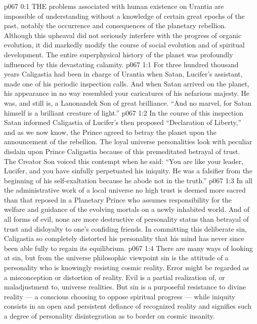 \vs p067 0:1 THE problems associated with human existence on Urantia are impossible of understanding without a knowledge of certain great epochs of the past, notably the occurrence and consequences of the planetary rebellion. Although this upheaval did not seriously interfere with the progress of organic evolution, it did markedly modify the course of social evolution and of spiritual development. The entire superphysical history of the planet was profoundly influenced by this devastating calamity.
\vs p067 1:1 For three hundred thousand years Caligastia had been in charge of Urantia when Satan, Lucifer’s assistant, made one of his periodic inspection calls. And when Satan arrived on the planet, his appearance in no way resembled your caricatures of his nefarious majesty. He was, and still is, a Lanonandek Son of great brilliance. “And no marvel, for Satan himself is a brilliant creature of light.”
\vs p067 1:2 In the course of this inspection Satan informed Caligastia of Lucifer’s then proposed “Declaration of Liberty,” and as we now know, the Prince agreed to betray the planet upon the announcement of the rebellion. The loyal universe personalities look with peculiar disdain upon Prince Caligastia because of this premeditated betrayal of trust. The Creator Son voiced this contempt when he said: “You are like your leader, Lucifer, and you have sinfully perpetuated his iniquity. He was a falsifier from the beginning of his self\hyp{}exaltation because he abode not in the truth.”
\vs p067 1:3 In all the administrative work of a local universe no high trust is deemed more sacred than that reposed in a Planetary Prince who assumes responsibility for the welfare and guidance of the evolving mortals on a newly inhabited world. And of all forms of evil, none are more destructive of personality status than betrayal of trust and disloyalty to one’s confiding friends. In committing this deliberate sin, Caligastia so completely distorted his personality that his mind has never since been able fully to regain its equilibrium.
\vs p067 1:4 \pc There are many ways of looking at sin, but from the universe philosophic viewpoint sin is the attitude of a personality who is knowingly resisting cosmic reality. Error might be regarded as a misconception or distortion of reality. Evil is a partial realization of, or maladjustment to, universe realities. But sin is a purposeful resistance to divine reality --- a conscious choosing to oppose spiritual progress --- while iniquity consists in an open and persistent defiance of recognized reality and signifies such a degree of personality disintegration as to border on cosmic insanity.
